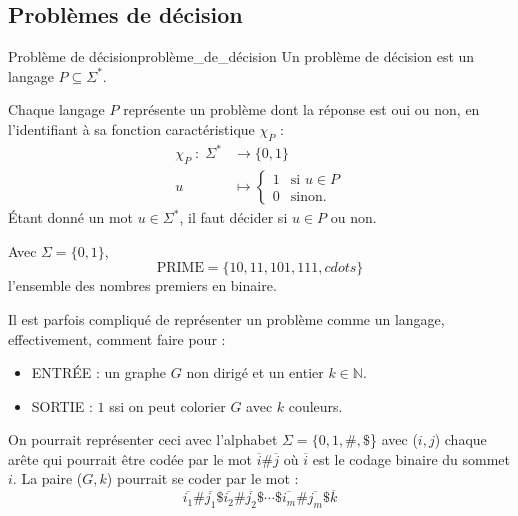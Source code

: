 \subsection{Problèmes de décision}
\label{sub:problemes_de_decision}

\begin{definition}{Problème de décision}{problème_de_décision}
  Un problème de décision est un langage $P\subseteq\Sigma^*$.
\end{definition}
\begin{remark}
    Chaque langage $P$ représente un problème dont la réponse est oui ou non, en l'identifiant à sa fonction caractéristique
    $\chi_P$ :
    \begin{equation*}
        \begin{aligned}
            \chi_P\; :\; \Sigma^* &\rightarrow \{0,1\} \\
            u &\mapsto \begin{cases}
                1 & \text{si } u \in P \\
                0 & \text{sinon.}
            \end{cases}
        \end{aligned}
    \end{equation*}
    Étant donné un mot $u\in \Sigma^*$, il faut décider si $u\in P$ ou non.
\end{remark}
\begin{example}
    Avec $\Sigma = \{0,1\}$,
    \begin{equation*}
        \text{PRIME} = \{10,11,101,111,cdots\} 
    \end{equation*}
    l'ensemble des nombres premiers en binaire.
\end{example}
Il est parfois compliqué de représenter un problème comme un langage, effectivement, comment faire pour :
\begin{itemize}[label=\textbullet]
    \item ENTRÉE : un graphe $G$ non dirigé et un entier $k\in\mathbb{N}$.
    \item SORTIE : $1$ ssi on peut colorier $G$ avec $k$ couleurs.
\end{itemize}
On pourrait représenter ceci avec l'alphabet $\Sigma = \{0,1,\#,\$$\} avec ($i,j$) chaque arête qui pourrait être codée par 
le mot $\overline{i}\#\overline{j}$ où $\overline{i}$ est le codage binaire du sommet $i$. La paire ($G,k$) pourrait se 
coder par le mot :
\begin{equation*}
    \overline{i_1}\#\overline{j_1}\$\overline{i_2}\#\overline{j_2}\$\cdots\$\overline{i_m}\#\overline{j_m}\$\overline{k}
\end{equation*}

